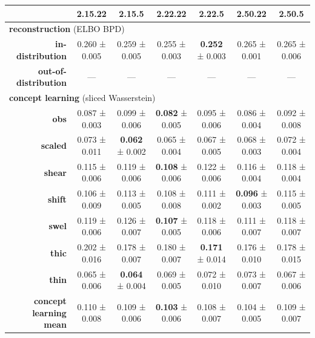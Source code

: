\begin{tabular}{rcccccc}
\toprule
& \textbf{2.15.22} & \textbf{2.15.5} & \textbf{2.22.22} & \textbf{2.22.5} & \textbf{2.50.22} & \textbf{2.50.5} \\
\midrule
\multicolumn{ 7 }{l}{\textbf{reconstruction}  (ELBO BPD)} \\
\midrule
\textbf{in-distribution} & 0.260 ± 0.005 & 0.259 ± 0.005 & 0.255 ± 0.003 & \textbf{0.252} ± 0.003 & 0.265 ± 0.001 & 0.265 ± 0.006 \\
\textbf{out-of-distribution} & --- & --- & --- & --- & --- & --- \\
\midrule
\multicolumn{ 7 }{l}{\textbf{concept learning}  (sliced Wasserstein)} \\
\midrule
\textbf{obs} & 0.087 ± 0.003 & 0.099 ± 0.006 & \textbf{0.082} ± 0.005 & 0.095 ± 0.006 & 0.086 ± 0.004 & 0.092 ± 0.008 \\
\textbf{scaled} & 0.073 ± 0.011 & \textbf{0.062} ± 0.002 & 0.065 ± 0.004 & 0.067 ± 0.005 & 0.068 ± 0.003 & 0.072 ± 0.004 \\
\textbf{shear} & 0.115 ± 0.006 & 0.119 ± 0.006 & \textbf{0.108} ± 0.006 & 0.122 ± 0.006 & 0.116 ± 0.004 & 0.118 ± 0.004 \\
\textbf{shift} & 0.106 ± 0.009 & 0.113 ± 0.005 & 0.108 ± 0.008 & 0.111 ± 0.002 & \textbf{0.096} ± 0.003 & 0.115 ± 0.005 \\
\textbf{swel} & 0.119 ± 0.006 & 0.126 ± 0.007 & \textbf{0.107} ± 0.005 & 0.118 ± 0.006 & 0.111 ± 0.007 & 0.118 ± 0.007 \\
\textbf{thic} & 0.202 ± 0.016 & 0.178 ± 0.007 & 0.180 ± 0.007 & \textbf{0.171} ± 0.014 & 0.176 ± 0.010 & 0.178 ± 0.015 \\
\textbf{thin} & 0.065 ± 0.006 & \textbf{0.064} ± 0.004 & 0.069 ± 0.005 & 0.072 ± 0.010 & 0.073 ± 0.007 & 0.067 ± 0.006 \\
\addlinespace
\textbf{concept learning mean} & 0.110 ± 0.008 & 0.109 ± 0.006 & \textbf{0.103} ± 0.006 & 0.108 ± 0.007 & 0.104 ± 0.005 & 0.109 ± 0.007 \\
\midrule
\bottomrule
\end{tabular}